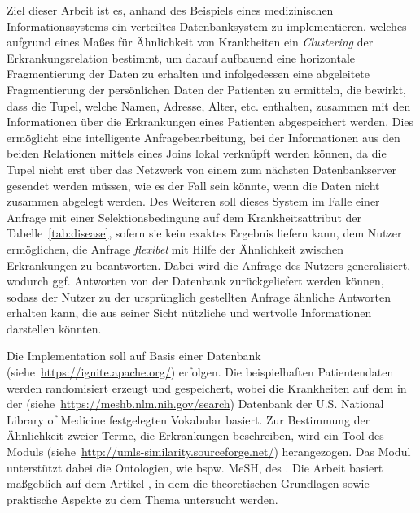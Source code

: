 \documentclass[a4paper, 11pt]{article}
\begin{document}
Ziel dieser Arbeit ist es, anhand des Beispiels eines medizinischen Informationssystems ein verteiltes Datenbanksystem zu implementieren, welches aufgrund 
eines Maßes für Ähnlichkeit von Krankheiten ein \emph{Clustering} der Erkrankungsrelation bestimmt, um darauf aufbauend eine horizontale Fragmentierung der 
Daten zu erhalten und infolgedessen eine abgeleitete Fragmentierung der persönlichen Daten der Patienten zu ermitteln, die bewirkt, dass die Tupel, welche 
Namen, Adresse, Alter, etc. enthalten, zusammen mit den Informationen über die Erkrankungen eines Patienten abgespeichert werden.
Dies ermöglicht eine intelligente Anfragebearbeitung, bei der Informationen aus den beiden Relationen mittels eines Joins lokal verknüpft werden können, 
da die Tupel nicht erst über das Netzwerk von einem zum nächsten Datenbankserver gesendet werden müssen, wie es der Fall sein könnte, wenn die Daten nicht
zusammen abgelegt werden. Des Weiteren soll dieses System im Falle einer Anfrage mit einer Selektionsbedingung auf dem Krankheitsattribut der 
Tabelle~\ref{tab:disease}, sofern sie kein exaktes Ergebnis liefern kann, dem Nutzer ermöglichen, die Anfrage \emph{flexibel} mit Hilfe der Ähnlichkeit 
zwischen Erkrankungen zu beantworten. Dabei wird die Anfrage des Nutzers generalisiert, wodurch ggf. Antworten von der Datenbank zurückgeliefert werden können,
sodass der Nutzer zu der ursprünglich gestellten Anfrage ähnliche Antworten erhalten kann, die aus seiner Sicht nützliche und wertvolle Informationen 
darstellen könnten.


Die Implementation soll auf Basis einer  Datenbank (siehe~\url{https://ignite.apache.org/}) erfolgen. Die beispielhaften Patientendaten 
werden randomisiert erzeugt und gespeichert, wobei die Krankheiten auf dem in der 
(siehe~\url{https://meshb.nlm.nih.gov/search}) Datenbank der U.S. National Library of Medicine festgelegten Vokabular basiert. Zur Bestimmung der Ähnlichkeit
zweier Terme, die Erkrankungen beschreiben, wird ein Tool des  Moduls (siehe~\url{http://umls-similarity.sourceforge.net/}) herangezogen.
Das Modul unterstützt dabei die Ontologien, wie bspw. MeSH, des .
Die Arbeit basiert maßgeblich auf dem Artikel \citet{Wiese2014}, in dem die theoretischen Grundlagen sowie praktische Aspekte zu dem Thema untersucht werden.


\newpage

\end{document}
